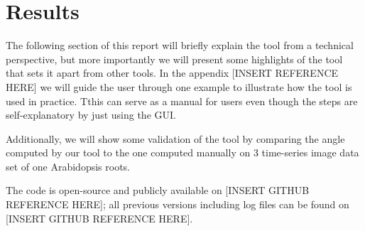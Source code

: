 
\chapter{Results} %

\label{results} %

%





The following section of this report will briefly explain the tool from a technical perspective, but more importantly  %
we will present some highlights of the tool that sets it apart from other tools. In the appendix [INSERT REFERENCE HERE] we will guide the user through one example to illustrate how the tool is used in practice. Tthis can serve as a manual for users even though the steps are self-explanatory by just using the GUI. 

Additionally, we will show some validation of the tool by comparing the angle computed by our tool to the one computed manually on 3 time-series image data set of one Arabidopsis roots. 

The code is open-source and publicly available on [INSERT GITHUB REFERENCE HERE]; all previous versions including log files can be found on [INSERT GITHUB REFERENCE HERE].


